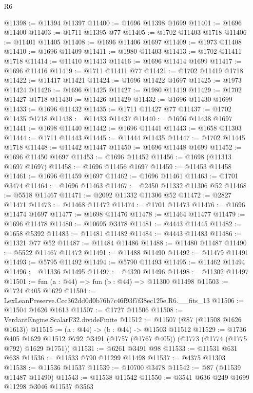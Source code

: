 \begin{lexlean}{R6}
\begin{coremodule}
@11398 := @11394 @11397
@11400 := @1696 @11398 @1699
@11401 := @1696 @11400
@11403 := @1711 @11395 @77
@11405 := @1702 @11403 @1718
@11406 := @11401 @11405
@11408 := @1696 @11406 @1697
@11409 := @1973 @11408
@11410 := @1696 @11409
@11411 := @1980 @11403
@11413 := @1702 @11411 @1718
@11414 := @11410 @11413
@11416 := @1696 @11414 @1699
@11417 := @1696 @11416
@11419 := @1711 @11411 @77
@11421 := @1702 @11419 @1718
@11422 := @11417 @11421
@11424 := @1696 @11422 @1697
@11425 := @1973 @11424
@11426 := @1696 @11425
@11427 := @1980 @11419
@11429 := @1702 @11427 @1718
@11430 := @11426 @11429
@11432 := @1696 @11430 @1699
@11433 := @1696 @11432
@11435 := @1711 @11427 @77
@11437 := @1702 @11435 @1718
@11438 := @11433 @11437
@11440 := @1696 @11438 @1697
@11441 := @1698 @11440
@11442 := @1696 @11441
@11443 := @1658 @11303
@11444 := @1711 @11443
@11445 := @11444 @11435
@11447 := @1702 @11445 @1718
@11448 := @11442 @11447
@11450 := @1696 @11448 @1699
@11452 := @1696 @11450 @1697
@11453 := @1696 @11452
@11456 := @1698 (@11313 @1697 @1697)
@11458 := @1696 @11456 @1697
@11459 := @11453 @11458
@11461 := @1696 @11459 @1697
@11462 := @1696 @11461
@11463 := @1701 @3474
@11464 := @1696 @11463
@11467 := @2450 @11332 @11306 @52
@11468 := @5518 @11467
@11471 := @2092 @11332 @11306 @52
@11472 := @2827 @11471
@11473 := @11468 @11472
@11474 := @1701 @11473
@11476 := @1696 @11474 @1697
@11477 := @1698 @11476
@11478 := @11464 @11477
@11479 := @1696 @11478
@11480 := @10695 @3478
@11481 := @4443 @11445
@11482 := @1658 @5392
@11483 := @11481 @11482
@11484 := @4443 @11483
@11486 := @11321 @77 @52
@11487 := @11484 @11486
@11488 := @11480 @11487
@11490 := @5522 @11467 @11472
@11491 := @11488 @11490
@11492 := @11479 @11491
@11493 := @5795 @11492
@11494 := @5790 @11493
@11495 := @11462 @11494
@11496 := @11336 @11495
@11497 := @4320 @11496
@11498 := @11302 @11497
@11501 := fun (a : @44) => fun (b : @44) => @11300 @11498
@11503 := @1724 @405 @1629
@11504 := LexLeanPreserve.Ccc362dd0d0b76b7c46f93f7f38ec125e.R6.__fits_13
@11506 := @11504 @1626 @1613
@11507 := @1727 @11506
@11508 := VerdantEngine.ScalarF32.divideFinite
@11512 := @11507 (@87 (@11508 @1626 @1613))
@11515 := (a : @44) -> (b : @44) -> @11503 @11512
@11529 := @1736
    @405
    @1629
    @11512
    @792
    @3491
    (@1757 (@1767 @405))
    (@1773 (@1774 (@1775 @792) @1629 @1751))
@11531 := @6261 @3491 @98
@11533 := @11531 @631 @638
@11536 := @11533 @790 @11299 @11498
@11537 := @4375 @11303
@11538 := @11536 @11537
@11539 := @10700 @3478
@11542 := @87 (@11539 @11487 @11490)
@11543 := @11538 @11542
@11550 := @3541 @636 @249 @1699 @11298 @3046 @11537 @3563

\end{coremodule}
\end{lexlean}
